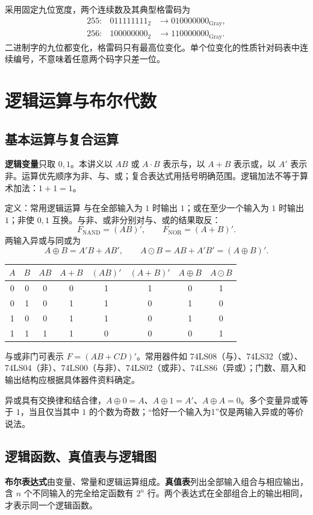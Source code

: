 \documentclass[UTF8,fontset=none,zihao=-4,a4paper]{ctexart}
\newcommand{\chapterpage}[1]{\clearpage\section{#1}}
\newcommand{\term}[1]{\textbf{#1}}
\begin{document}
采用固定九位宽度，两个连续数及其典型格雷码为
\[
\begin{array}{ccl}
255:&011111111_2&\longrightarrow010000000_{\mathrm{Gray}},\\
256:&100000000_2&\longrightarrow110000000_{\mathrm{Gray}}.
\end{array}
\]
二进制字的九位都变化，格雷码只有最高位变化。单个位变化的性质针对码表中连续编号，不意味着任意两个码字只差一位。


\chapterpage{逻辑运算与布尔代数}
\subsection{基本运算与复合运算}
\term{逻辑变量}只取 $0,1$。本讲义以 $AB$ 或 $A\cdot B$ 表示与，以 $A+B$ 表示或，以 $A'$ 表示非。运算优先顺序为非、与、或；复合表达式用括号明确范围。逻辑加法不等于算术加法：$1+1=1$。
\begin{infobox}{定义：常用逻辑运算}
与在全部输入为 $1$ 时输出 $1$；或在至少一个输入为 $1$ 时输出 $1$；非使 $0,1$ 互换。与非、或非分别对与、或的结果取反：
\[
F_{\mathrm{NAND}}=(AB)',\qquad F_{\mathrm{NOR}}=(A+B)'.
\]
两输入异或与同或为
\[
A\oplus B=A'B+AB',\qquad A\odot B=AB+A'B'=(A\oplus B)'.
\]
\end{infobox}
\begin{center}
\begin{tabular}{cc cccccc}
\toprule $A$&$B$&$AB$&$A+B$&$(AB)'$&$(A+B)'$&$A\oplus B$&$A\odot B$\\\midrule
0&0&0&0&1&1&0&1\\
0&1&0&1&1&0&1&0\\
1&0&0&1&1&0&1&0\\
1&1&1&1&0&0&0&1\\\bottomrule
\end{tabular}
\end{center}
与或非门可表示 $F=(AB+CD)'$。常用器件如 74LS08（与）、74LS32（或）、74LS04（非）、74LS00（与非）、74LS02（或非）、74LS86（异或）；门数、扇入和输出结构应根据具体器件资料确定。

异或具有交换律和结合律，$A\oplus0=A$、$A\oplus1=A'$、$A\oplus A=0$。多个变量异或等于 $1$，当且仅当其中 $1$ 的个数为奇数；“恰好一个输入为1”仅是两输入异或的等价说法。

\subsection{逻辑函数、真值表与逻辑图}
\term{布尔表达式}由变量、常量和逻辑运算组成。\term{真值表}列出全部输入组合与相应输出，含 $n$ 个不同输入的完全给定函数有 $2^n$ 行。两个表达式在全部组合上的输出相同，才表示同一个逻辑函数。
\end{document}
